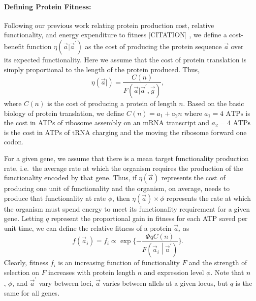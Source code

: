 \documentclass[13pt]{article}
\newcommand{\avec}{\ensuremath{\vec{a}}\xspace}
\newcommand{\avecopt}{\ensuremath{\vec{a}^\prime}\xspace}
\begin{document}
\paragraph*{Defining Protein Fitness:} 
Following our previous work relating protein production cost, relative functionality, and energy expenditure to fitness [CITATION] \cite{Gilchrist2007,ShahAndGilchrist11}, we define a cost-benefit function $\eta(\avec|\avecopt)$ as the cost of producing the protein sequence \avec over its expected functionality.
Here we assume that the cost of protein translation is simply proportional to the length of the protein produced.
Thus,
\begin{equation}
\label{eq:etadef}
\eta\left(\avec |\right) = \frac{C(n)}{F\left(\vec{a} | \avecopt,\vec{g}\right)},
\end{equation}
where $C(n)$ is the cost of producing a protein of length $n$.
Based on the basic biology of protein translation, we define $C(n) = a_1 + a_2 n $ where  $a_1 = 4\text{ ATPs}$ is the cost in ATPs of ribosome assembly on an mRNA transcript and $a_2 = 4 \text{ ATPs}$ is the cost in ATPs of tRNA charging and the moving the ribosome forward one codon.

For a given gene, we assume that there is a mean target functionality production rate, i.e.~the average rate at which the organism requires the production of the functionality encoded by that gene.
Thus, if $\eta(\avec)$ represents the cost of producing one unit of functionality and the organism, on average, needs to produce that functionality at rate $\phi$, then $\eta(\avec) \times \phi$ represents the rate at which the organism must spend energy to meet its functionality requirement for a given gene.
Letting $q$ represent the proportional gain in fitness for each ATP saved per unit time, we can define the relative fitness of a protein $\avec_i$ as
\[
f(\avec_i) = f_i  \propto \exp\{-\frac{\Phi q C(n)}{F\left(\avec_i\middle|\avecopt\right)}\}.
\]
Clearly, fitness $f_i$ is an increasing function of functionality $F$ and the strength of selection on $F$ increases with protein length $n$ and expression level $\phi$.
Note that $n$, $\phi$, and \avecopt vary between loci, \avec varies between allels at a given locus, but $q$ is the same for all genes.
\end{document}
